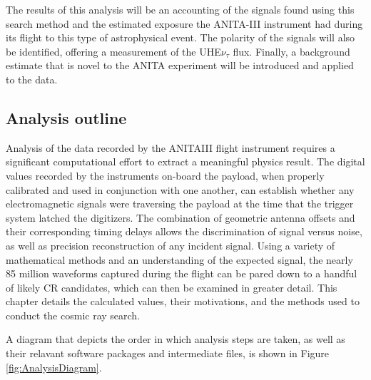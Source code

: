 	The results of this analysis will be an accounting of the signals found using this search method and the estimated exposure the ANITA-III instrument had during its flight to this type of astrophysical event.  The polarity of the signals will also be identified, offering a measurement of the UHE$\nu_{\tau}$ flux.  Finally, a background estimate that is novel to the ANITA experiment will be introduced and applied to the data.
	
	\subsection{Analysis outline}
	Analysis of the data recorded by the ANITAIII flight instrument requires a significant computational effort to extract a meaningful physics result.  The digital values recorded by the instruments on-board the payload, when properly calibrated and used in conjunction with one another, can establish whether any electromagnetic signals were traversing the payload at the time that the trigger system latched the digitizers.  The combination of geometric antenna offsets and their corresponding timing delays allows the discrimination of signal versus noise, as well as precision reconstruction of any incident signal.  Using a variety of mathematical methods and an understanding of the expected signal, the nearly 85 million waveforms captured during the flight can be pared down to a handful of likely CR candidates, which can then be examined in greater detail.  This chapter details the calculated values, their motivations, and the methods used to conduct the cosmic ray search.
	
	A diagram that depicts the order in which analysis steps are taken, as well as their relavant software packages and intermediate files, is shown in Figure \ref{fig:AnalysisDiagram}. 
	
